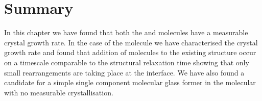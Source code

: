 \section{Summary}

In this chapter we have found that both the \done and \dcon molecules have a measurable crystal growth rate. In the case of the \done molecule we have characterised the crystal growth rate and found that addition of molecules to the existing structure occur on a timescale comparable to the structural relaxation time showing that only small rearrangements are taking place at the interface. We have also found a candidate for a simple single component molecular glass former in the \tri molecular with no measurable crystallisation.
